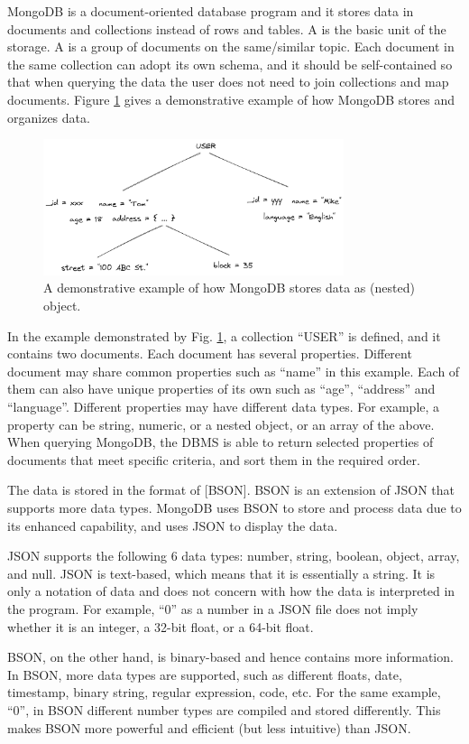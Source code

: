 MongoDB is a document-oriented database program and it stores data in documents and collections instead of rows and tables. A  is the basic unit of the storage. A  is a group of documents on the same/similar topic. Each document in the same collection can adopt its own schema, and it should be self-contained so that when querying the data the user does not need to join collections and map documents. Figure \ref{ch:database:mongotree} gives a demonstrative example of how MongoDB stores and organizes data.
\begin{figure}[htbp]
	\centering
	\includegraphics[width=250pt]{chapters/part-3/figures/mongodb_tree.png}
	\caption{A demonstrative example of how MongoDB stores data as (nested) object.} \label{ch:database:mongotree}
\end{figure}

In the example demonstrated by Fig. \ref{ch:database:mongotree}, a collection ``USER'' is defined, and it contains two documents. Each document has several properties. Different document may share common properties such as ``name'' in this example. Each of them can also have unique properties of its own such as ``age'', ``address'' and ``language''. Different properties may have different data types. For example, a property can be string, numeric, or a nested object, or an array of the above. When querying MongoDB, the DBMS is able to return selected properties of documents that meet specific criteria, and sort them in the required order.

The data is stored in the format of [BSON]. BSON is an extension of JSON that supports more data types. MongoDB uses BSON to store and process data due to its enhanced capability, and uses JSON to display the data.

\begin{shortbox}
	
	JSON supports the following 6 data types: number, string, boolean, object, array, and null. JSON is text-based, which means that it is essentially a string. It is only a notation of data and does not concern with how the data is interpreted in the program. For example, ``0'' as a number in a JSON file does not imply whether it is an integer, a 32-bit float, or a 64-bit float.
	
	BSON, on the other hand, is binary-based and hence contains more information. In BSON, more data types are supported, such as different floats, date, timestamp, binary string, regular expression, code, etc. For the same example, ``0'', in BSON different number types are compiled and stored differently. This makes BSON more powerful and efficient (but less intuitive) than JSON.
	
\end{shortbox}

